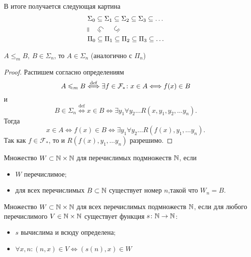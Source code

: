 В итоге получается следующая картина
\begin{align*}
	& \Sigma_0 \subseteq \Sigma _1 \subseteq  \Sigma _2 \subseteq \Sigma _3 \subseteq \ldots \\
	&\rotatebox[origin=c]{90}{=} \quad \rotatebox[origin=c]{-45}{$\subseteq$} \quad~  \rotatebox[origin=c]{45}{$\subseteq$}\\
	& \Pi_0 \subseteq \Pi _1 \subseteq  \Pi _2 \subseteq \Pi _3 \subseteq \ldots
\end{align*}

\begin{thm}
    $ A \le _m B ,  ~ B \in \Sigma _n$, то $ A \in \Sigma _{n}$ (аналогично с $ \Pi_n$)   
\end{thm}
\begin{proof}
	Распишем согласно определениям
	\[
		A \leqslant _m B \stackrel{\operatorname{def}}{\Longleftrightarrow }  \exists f \in \mathcal{F}_{*}\colon x \in A \Longleftrightarrow f(x) \in  B
	\] 
	и
	\[
		B \in \Sigma _n \stackrel{\operatorname{def}}{\Longleftrightarrow } x \in B \Longleftrightarrow \exists y_1 \forall y_2 \ldots R(x, y_1, y_2, \ldots y_n)
	.\] 
	Тогда 
	\[
		x \in A \Longleftrightarrow f(x) \in B \Longleftrightarrow \exists y_1 \forall y_2 \ldots R(f(x), y_1, \ldots y_{n})
	.\] 
	Так как $ f\in \mathcal{F}_*$, то и $ R(f(x), y_1, \ldots y_n)$ разрешимо.
\end{proof}

\begin{defn}
	Множество $ W \subset \mathbb{N} \times \mathbb{N}$  для перечислимых подмножеств $ \mathbb{N}$, если
	\begin{itemize}
		\item $ W $ перечислимое;
		\item для всех перечислимых $ B \subset \mathbb{N}$ существует номер $ n$,такой что $ W_n = B$.
	\end{itemize}
\end{defn}

\begin{defn}
	Множество $ W \subset \mathbb{N} \times \mathbb{N}$  для всех перечислимых подмножеств $ \mathbb{N}$, если
для любого перечислимого $ V \in \mathbb{N} \times \mathbb{N}$ существует функция $ s \colon \mathbb{N} \to  \mathbb{N}$:
	\begin{itemize}
		\item $s$ вычислима и всюду определена;
		\item $ \forall x, n\colon  (n, x) \in  V \Longleftrightarrow (s(n), x) \in  W$
	\end{itemize}
\end{defn}

